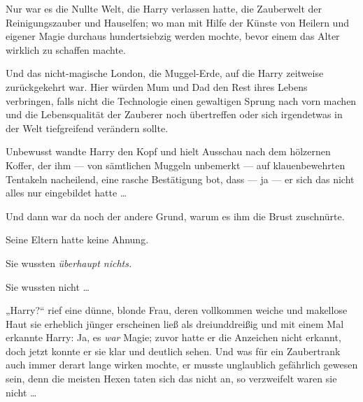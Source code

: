 Nur war es die Nullte Welt, die Harry verlassen hatte, die Zauberwelt der Reinigungszauber und Hauselfen; wo man mit Hilfe der Künste von Heilern und eigener Magie durchaus hundertsiebzig werden mochte, bevor einem das Alter wirklich zu schaffen machte.

Und das nicht-magische London, die Muggel-Erde, auf die Harry zeitweise zurückgekehrt war. Hier würden Mum und Dad den Rest ihres Lebens verbringen, falls nicht die Technologie einen gewaltigen Sprung nach vorn machen und die Lebensqualität der Zauberer noch übertreffen oder sich irgendetwas in der Welt tiefgreifend verändern sollte.

Unbewusst wandte Harry den Kopf und hielt Ausschau nach dem hölzernen Koffer, der ihm — von sämtlichen Muggeln unbemerkt — auf klauenbewehrten Tentakeln nacheilend, eine rasche Bestätigung bot, dass — ja — er sich das nicht alles nur eingebildet hatte …

Und dann war da noch der andere Grund, warum es ihm die Brust zuschnürte.

Seine Eltern hatte keine Ahnung.

Sie wussten \emph{überhaupt nichts.}

Sie wussten nicht …

„Harry?“ rief eine dünne, blonde Frau, deren vollkommen weiche und makellose Haut sie erheblich jünger erscheinen ließ als dreiunddreißig und mit einem Mal erkannte Harry: Ja, es \emph{war} Magie; zuvor hatte er die Anzeichen nicht erkannt, doch jetzt konnte er sie klar und deutlich sehen. Und was für ein Zaubertrank auch immer derart lange wirken mochte, er musste unglaublich gefährlich gewesen sein, denn die meisten Hexen taten sich das nicht an, so verzweifelt waren sie nicht …


